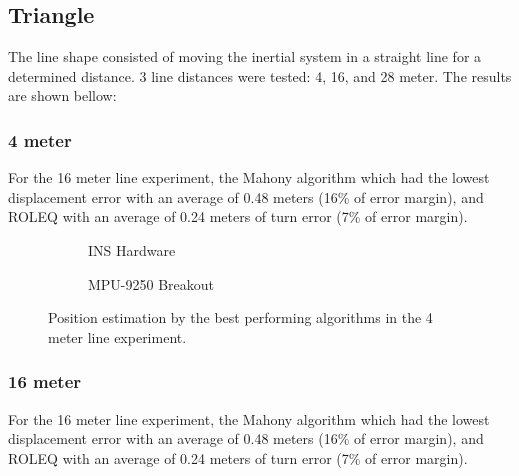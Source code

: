 \subsection{Triangle}

The line shape consisted of moving the inertial system in a straight line for a determined distance. 3 line distances were tested: 4, 16, and 28 meter. The results are shown bellow:

\subsubsection{4 meter}

For the 16 meter line experiment, the Mahony algorithm which had the lowest displacement error with an average of 0.48 meters (16\% of error margin), and ROLEQ with an average of 0.24 meters of turn error (7\% of error margin).

\begin{figure}[!h]
    \centering
    
\end{figure}

\begin{figure}[!h]
    \centering
    \begin{subfigure}{0.49\textwidth}
        \centering
        \resizebox{1\linewidth}{!}{}
        \caption{INS Hardware}
        \label{fig:triangle4_2D}
    \end{subfigure}
    \begin{subfigure}{0.49\textwidth}
        \centering
        \resizebox{1\linewidth}{!}{}
        \caption{MPU-9250 Breakout}
        \label{fig:triangle4_3D}
    \end{subfigure}
    \caption{Position estimation by the best performing algorithms in the 4 meter line experiment.}
    \label{fig:triangle4}
\end{figure}

\subsubsection{16 meter}

For the 16 meter line experiment, the Mahony algorithm which had the lowest displacement error with an average of 0.48 meters (16\% of error margin), and ROLEQ with an average of 0.24 meters of turn error (7\% of error margin).

\begin{figure}[!h]
    \centering
    
\end{figure}


